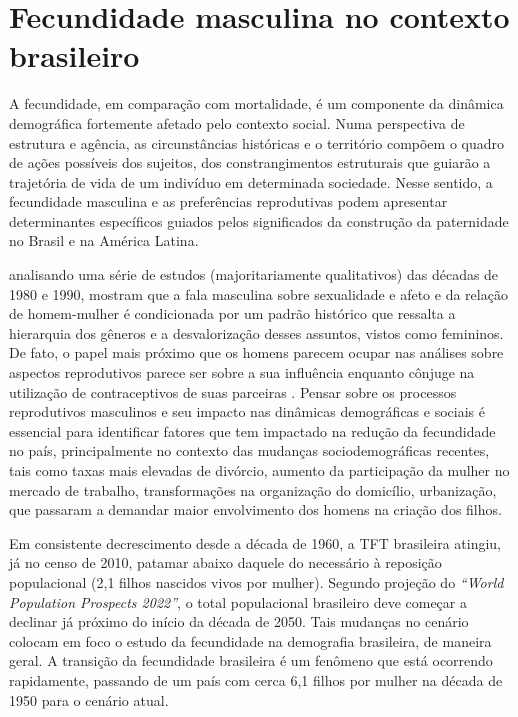 \section{Fecundidade masculina no contexto brasileiro}

A fecundidade, em comparação com mortalidade, é um componente da dinâmica demográfica fortemente afetado pelo contexto social. Numa perspectiva de estrutura e agência, as circunstâncias históricas e o território compõem o quadro de ações possíveis dos sujeitos, dos constrangimentos estruturais que guiarão a trajetória de vida de um indivíduo em determinada sociedade. Nesse sentido, a fecundidade masculina e as preferências reprodutivas podem apresentar determinantes específicos guiados pelos significados da construção da paternidade no Brasil e na América Latina.

 analisando uma série de estudos (majoritariamente qualitativos) das décadas de 1980 e 1990, mostram que a fala masculina sobre sexualidade e afeto e da relação de homem-mulher é condicionada por um padrão histórico que ressalta a hierarquia dos gêneros e a desvalorização desses assuntos, vistos como femininos. De fato, o papel mais próximo que os homens parecem ocupar nas análises sobre aspectos reprodutivos parece ser sobre a sua influência enquanto cônjuge na utilização de contraceptivos de suas parceiras \cite{carvalho2001participaccao}. Pensar sobre os processos reprodutivos masculinos e seu impacto nas dinâmicas demográficas e sociais é essencial para identificar fatores que tem impactado na redução da fecundidade no país, principalmente no contexto das mudanças sociodemográficas recentes, tais como taxas mais elevadas de divórcio, aumento da participação da mulher no mercado de trabalho, transformações na organização do domicílio, urbanização, que passaram a demandar maior envolvimento dos homens na criação dos filhos. 

Em consistente decrescimento desde a década de 1960, a TFT brasileira atingiu, já no censo de 2010, patamar abaixo daquele do necessário à reposição populacional (2,1 filhos nascidos vivos por mulher). Segundo projeção do \textit{“World Population Prospects 2022”}\cite{desa2022united}, o total populacional brasileiro deve começar a declinar já próximo do início da década de 2050. Tais mudanças no cenário colocam em foco o estudo da fecundidade na demografia brasileira, de maneira geral. A transição da fecundidade brasileira é um fenômeno que está ocorrendo rapidamente, passando de um país com cerca 6,1 filhos por mulher na década de 1950 para o cenário atual. 

